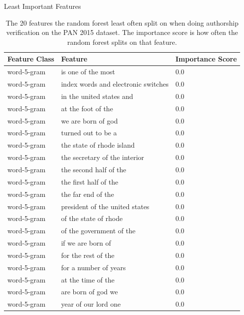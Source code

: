 \documentclass[10pt]{beamer}
\begin{document}
\begin{frame}[fragile]{Least Important Features}
\begin{table}
    \centering
    \begin{tabular}{lll}
        \textbf{Feature Class} & \textbf{Feature} & \textbf{Importance Score} \\
        \hline
        word-5-gram & is one of the most                  & 0.0 \\
        word-5-gram & index words and electronic switches & 0.0 \\
        word-5-gram & in the united states and            & 0.0 \\
        word-5-gram & at the foot of the                  & 0.0 \\
        word-5-gram & we are born of god                  & 0.0 \\
        word-5-gram & turned out to be a                  & 0.0 \\
        word-5-gram & the state of rhode island           & 0.0 \\
        word-5-gram & the secretary of the interior       & 0.0 \\
        word-5-gram & the second half of the              & 0.0 \\
        word-5-gram & the first half of the               & 0.0 \\
        word-5-gram & the far end of the                  & 0.0 \\
        word-5-gram & president of the united states      & 0.0 \\
        word-5-gram & of the state of rhode               & 0.0 \\
        word-5-gram & of the government of the            & 0.0 \\
        word-5-gram & if we are born of                   & 0.0 \\
        word-5-gram & for the rest of the                 & 0.0 \\
        word-5-gram & for a number of years               & 0.0 \\
        word-5-gram & at the time of the                  & 0.0 \\
        word-5-gram & are born of god we                  & 0.0 \\
        word-5-gram & year of our lord one                & 0.0
    \end{tabular}
    \caption{The 20 features the random forest least often split on when doing
    authorship verification on the PAN 2015 dataset. The importance score is how
    often the random forest splits on that feature.}
    \label{tab:feature_non_importance}
\end{table}
\end{frame}
\end{document}
